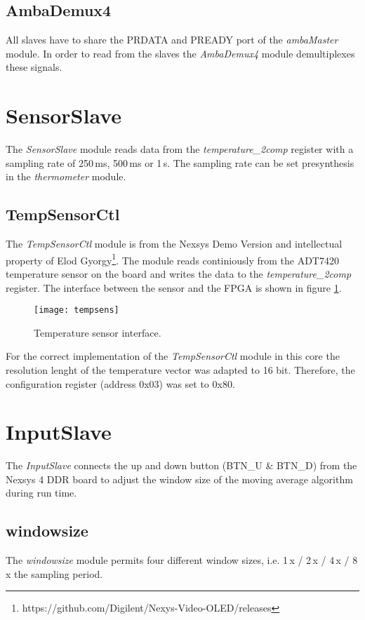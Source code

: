 \documentclass[%
	a4paper,
]
{article}
\begin{document}
\subsection{AmbaDemux4}
All slaves have to share the PRDATA and PREADY port of the \textit{ambaMaster} module. In order to read from the slaves the \textit{AmbaDemux4} module demultiplexes these signals.

\section{SensorSlave}
The \textit{SensorSlave} module reads data from the \textit{temperature_2comp} register with a sampling rate of 250\,ms, 500\,ms or 1\,s. The sampling rate can be set presynthesis in the \textit{thermometer} module.
\subsection{TempSensorCtl}
The \textit{TempSensorCtl} module is from the Nexsys Demo Version and intellectual property of Elod Gyorgy\footnote{https://github.com/Digilent/Nexys-Video-OLED/releases}. The module reads continiously from the ADT7420 temperature sensor on the board and writes the data to the \textit{temperature_2comp} register. The interface between the sensor and the FPGA is shown in figure \ref{fig:sensor}.

\begin{figure}[h!]
	\centering
	\texttt{[image: tempsens]}
	\caption{Temperature sensor interface.}
	\label{fig:sensor}
\end{figure}

For the correct implementation of the \textit{TempSensorCtl} module in this core the resolution lenght of the temperature vector was adapted to 16 bit. Therefore, the configuration register (address 0x03) was set to 0x80.

\section{InputSlave}
The \textit{InputSlave} connects the up and down button (BTN_U \& BTN_D) from the Nexsys 4 DDR board to adjust the window size of the moving average algorithm during run time.
\subsection{windowsize}
The \textit{windowsize} module permits four different window sizes, i.e. 1\,x / 2\,x / 4\,x / 8\,x the sampling period.
\end{document}
